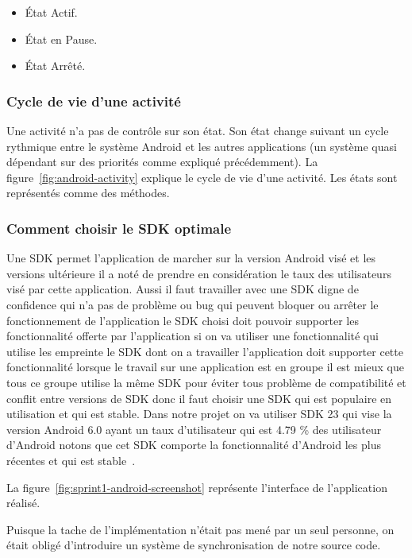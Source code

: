 \begin{itemize}
    \item État Actif.
    \item État en Pause.
    \item État Arrêté.
\end{itemize}

\subsubsection{Cycle de vie d'une activité}

Une activité n'a pas de contrôle sur son état. Son état change suivant un cycle
rythmique entre le système Android et les autres applications (un système quasi
dépendant sur des priorités comme expliqué précédemment). La
figure~\ref{fig:android-activity} explique le cycle de vie d'une activité. Les
états sont représentés comme des méthodes.



\subsubsection{Comment choisir le SDK optimale}

Une SDK permet l'application de marcher sur la version Android visé et les
versions ultérieure il a noté de prendre en considération le taux des
utilisateurs visé par cette application. Aussi il faut travailler avec une SDK
digne de confidence qui n'a pas de problème ou bug qui peuvent bloquer ou
arrêter le fonctionnement de l'application le SDK choisi doit pouvoir supporter
les fonctionnalité offerte par l'application si on va utiliser une
fonctionnalité qui utilise les empreinte le SDK dont on a travailler
l'application doit supporter cette fonctionnalité lorsque le travail sur une
application est en groupe il est mieux que tous ce groupe utilise la même SDK
pour éviter tous problème de compatibilité et conflit entre versions de SDK
donc il faut choisir une SDK qui est populaire en utilisation et qui est
stable. Dans notre projet on va utiliser SDK 23 qui vise la version Android 6.0
ayant un taux d'utilisateur qui est 4.79 \% des utilisateur d'Android notons
que cet SDK comporte la fonctionnalité d'Android les plus récentes et qui est
stable~\cite{android-sdk}.

La figure~\ref{fig:sprint1-android-screenshot} représente l'interface de
l'application réalisé.

Puisque la tache de l'implémentation n'était pas mené par un seul personne, on
était obligé d'introduire un système de synchronisation de notre source code.

